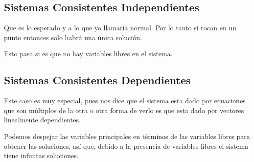 \documentclass[12pt, fleqn]{report}                             %
\theoremstyle{break}                                            %
\begin{document}
            \clearpage
            \subsection{Sistemas Consistentes Independientes}

                Que es lo esperado y a lo que yo llamaría normal.
                Por lo tanto si tocan en un punto entonces solo habrá una única solución.

                Esto pasa si es que no hay variables libres en el sistema.


            \vspace{2em}
            \subsection{Sistemas Consistentes Dependientes}

                Este caso es muy especial, pues nos dice que el sistema esta
                dado por ecuaciones que son múltiplos de la otra o otra forma
                de verlo es que esta dado por vectores linealmente dependientes.

                Podemos despejar las variables principales en términos de las variables
                libres para obtener las soluciones, así que, debido a la presencia
                de variables libres el sistema tiene infinitas soluciones.























    \clearpage
\end{document}
